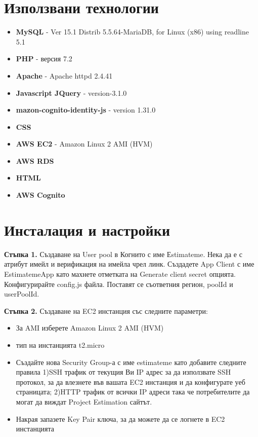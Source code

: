\documentclass[12pt]{article}
\begin{document}
\section{Използвани технологии}
\begin{itemize}
   
    \item \textbf{MySQL}    - Ver 15.1 Distrib 5.5.64-MariaDB, for Linux (x86) using readline 5.1
       
     \item \textbf{PHP} - версия 7.2
     
     \item \textbf{Apache} - Apache httpd 2.4.41
     
     \item \textbf{Javascript JQuery} - version-3.1.0
     
     \item \textbf{mazon-cognito-identity-js} - version 1.31.0
   
     \item \textbf{CSS}
   
    \item \textbf{AWS EC2} -  Amazon Linux 2 AMI (HVM)
    
    \item \textbf{AWS RDS} 
    
    \item \textbf{HTML} 
    
    \item \textbf{AWS Cognito} 
     

\end{itemize}


\section{Инсталация и настройки}
\noindent\textbf{Стъпка 1.} Създаване на User pool в Когнито с име Еstimateme. Нека да е с атрибут имейл и верификация на имейла чрел линк. Създадете App Client с име EstimatemeApp като махнете отметката на Generate client secret опцията. Конфигурирайте 
config.js файла. Поставят се съответния регион, poolId и userPoolId. 

\medskip

\noindent\textbf{Стъпка 2.} Създаване на EC2 инстанция със следните параметри:
\begin{itemize}
\item  За AMI изберете Amazon Linux 2 AMI (HVM)
\item тип на инстанцията t2.micro
\item Създайте нова Security Group-а с име estimateme като добавите
следните правила
 1)SSH трафик от текущия Ви IP адрес за да използвате SSH протокол, за да влезнете във вашата EC2 инстанция и да конфигурате уеб страницата;
 2)HTTP трафик от всички IP адреси така че потребителите да могат да виждат Project Estimation сайтът.
\item Накрая запазете Key Pair ключа, за да можете да се логнете в EC2 инстанцията
\end{itemize}
\end{document}
